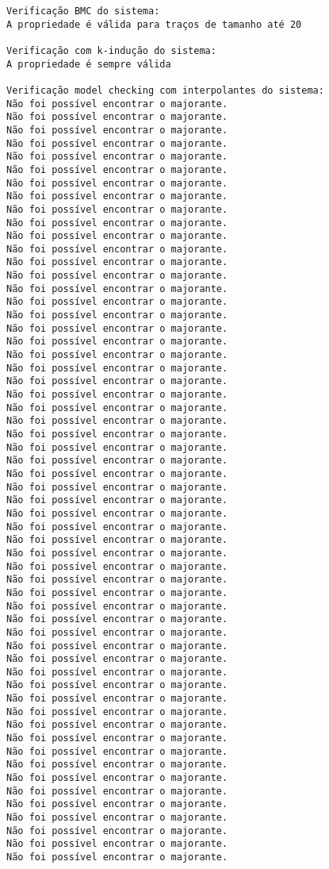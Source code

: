 \documentclass[11pt]{article}
\begin{document}
\begin{Verbatim}[commandchars=\\\{\}]
Verificação BMC do sistema:
A propriedade é válida para traços de tamanho até 20

Verificação com k-indução do sistema:
A propriedade é sempre válida

Verificação model checking com interpolantes do sistema:
Não foi possível encontrar o majorante.
Não foi possível encontrar o majorante.
Não foi possível encontrar o majorante.
Não foi possível encontrar o majorante.
Não foi possível encontrar o majorante.
Não foi possível encontrar o majorante.
Não foi possível encontrar o majorante.
Não foi possível encontrar o majorante.
Não foi possível encontrar o majorante.
Não foi possível encontrar o majorante.
Não foi possível encontrar o majorante.
Não foi possível encontrar o majorante.
Não foi possível encontrar o majorante.
Não foi possível encontrar o majorante.
Não foi possível encontrar o majorante.
Não foi possível encontrar o majorante.
Não foi possível encontrar o majorante.
Não foi possível encontrar o majorante.
Não foi possível encontrar o majorante.
Não foi possível encontrar o majorante.
Não foi possível encontrar o majorante.
Não foi possível encontrar o majorante.
Não foi possível encontrar o majorante.
Não foi possível encontrar o majorante.
Não foi possível encontrar o majorante.
Não foi possível encontrar o majorante.
Não foi possível encontrar o majorante.
Não foi possível encontrar o majorante.
Não foi possível encontrar o majorante.
Não foi possível encontrar o majorante.
Não foi possível encontrar o majorante.
Não foi possível encontrar o majorante.
Não foi possível encontrar o majorante.
Não foi possível encontrar o majorante.
Não foi possível encontrar o majorante.
Não foi possível encontrar o majorante.
Não foi possível encontrar o majorante.
Não foi possível encontrar o majorante.
Não foi possível encontrar o majorante.
Não foi possível encontrar o majorante.
Não foi possível encontrar o majorante.
Não foi possível encontrar o majorante.
Não foi possível encontrar o majorante.
Não foi possível encontrar o majorante.
Não foi possível encontrar o majorante.
Não foi possível encontrar o majorante.
Não foi possível encontrar o majorante.
Não foi possível encontrar o majorante.
Não foi possível encontrar o majorante.
Não foi possível encontrar o majorante.
Não foi possível encontrar o majorante.
Não foi possível encontrar o majorante.
Não foi possível encontrar o majorante.
Não foi possível encontrar o majorante.
Não foi possível encontrar o majorante.
Não foi possível encontrar o majorante.
Não foi possível encontrar o majorante.
Não foi possível encontrar o majorante.

\end{Verbatim}
\end{document}
